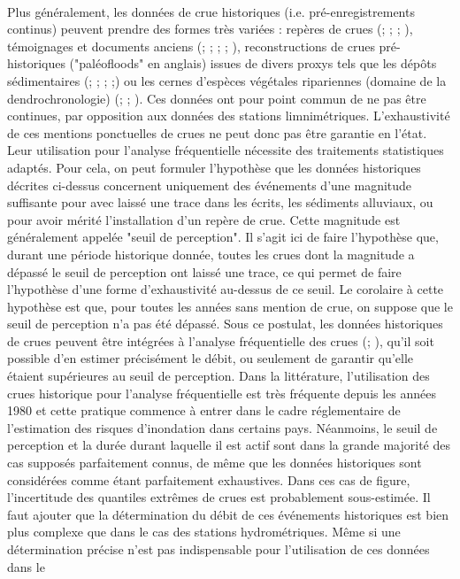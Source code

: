 \documentclass[11pt]{article}
\begin{document}
	\paragraph{} Plus généralement, les données de crue historiques (i.e. pré-enregistrements continus) peuvent prendre des formes très variées : repères de crues (\citet{parkes_defining_2016}; \citet{piotte_collection_2016}; \citet{engeland_new_2020}; \citet{medd_reperes_2023}), témoignages et documents anciens (\citet{pichard_les_1995}; \citet{naulet_flood_2005}; \citet{neppel_flood_2010}; \citet{kjeldsen_documentary_2014}; \citet{macdonald_reassessing_2014}), reconstructions de crues pré-historiques ("paléofloods" en anglais) issues de divers proxys tels que les dépôts sédimentaires (\citet{baker_paleoflood_1987}; \citet{dezileau_multidating_2014}; \citet{engeland_new_2020}; \citet{corella_1400-years_2021};\citet{wilhelm_reconstructing_2022}) ou les cernes d'espèces végétales ripariennes (domaine de la dendrochronologie) (\citet{martens_dendrochronological_1992}; \citet{loomans_flood_1993}; \citet{ballesteros-canovas_review_2015}). Ces données ont pour point commun de ne pas être continues, par opposition aux données des stations limnimétriques. L'exhaustivité de ces mentions ponctuelles de crues ne peut donc pas être garantie en l'état. Leur utilisation pour l'analyse fréquentielle nécessite des traitements statistiques adaptés. Pour cela, on peut formuler l'hypothèse que les données historiques décrites ci-dessus concernent uniquement des événements d'une magnitude suffisante pour avec laissé une trace dans les écrits, les sédiments alluviaux, ou pour avoir mérité l'installation d'un repère de crue. Cette magnitude est généralement appelée "seuil de perception". Il s'agit ici de faire l'hypothèse que, durant une période historique donnée, toutes les crues dont la magnitude a dépassé le seuil de perception ont laissé une trace, ce qui permet de faire l'hypothèse d'une forme d'exhaustivité au-dessus de ce seuil. Le corolaire à cette hypothèse est que, pour toutes les années sans mention de crue, on suppose que le seuil de perception n'a pas été dépassé. Sous ce postulat, les données historiques de crues peuvent être intégrées à l'analyse fréquentielle des crues (\citet{gerard_probability_1979}; \citet{stedinger_flood_1986}), qu'il soit possible d'en estimer précisément le débit, ou seulement de garantir qu'elle étaient supérieures au seuil de perception. Dans la littérature, l'utilisation des crues historique pour l'analyse fréquentielle est très fréquente depuis les années 1980 et cette pratique commence à entrer dans le cadre réglementaire de l'estimation des risques d'inondation dans certains pays. Néanmoins, le seuil de perception et la durée durant laquelle il est actif sont dans la grande majorité des cas supposés parfaitement connus, de même que les données historiques sont considérées comme étant parfaitement exhaustives. Dans ces cas de figure, l'incertitude  des quantiles extrêmes de crues est probablement sous-estimée. Il faut ajouter que la détermination du débit de ces événements historiques est bien plus complexe que dans le cas des stations hydrométriques. Même si une détermination précise n'est pas indispensable pour l'utilisation de ces données dans le 
\end{document}
